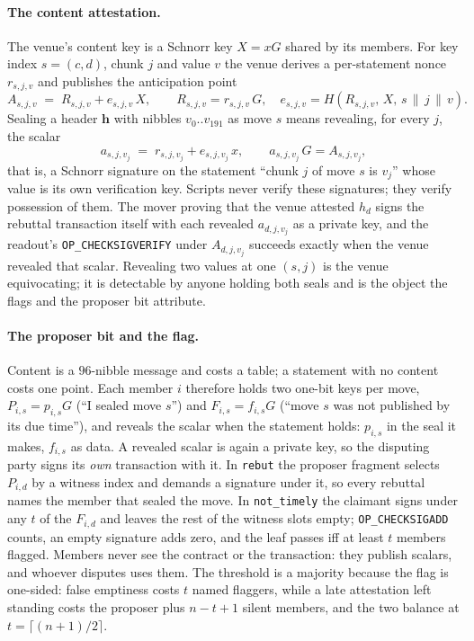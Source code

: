 \documentclass[11pt]{article}
\newcommand{\op}[1]{\texttt{OP\_#1}}
\begin{document}
\paragraph{The content attestation.}
The venue's content key is a Schnorr key $X = x G$ shared by its
members. For key index $s = (c, d)$, chunk $j$ and value $v$ the venue derives a
per-statement nonce $r_{s,j,v}$ and publishes the anticipation point
\[
  A_{s,j,v} \;=\; R_{s,j,v} + e_{s,j,v}\,X,
  \qquad R_{s,j,v} = r_{s,j,v}\,G,\quad
  e_{s,j,v} = H(R_{s,j,v},\,X,\,s\,\|\,j\,\|\,v).
\]
Sealing a header $\mathbf{h}$ with nibbles $v_0..v_{191}$ as move $s$
means revealing, for every $j$, the scalar
\[
  a_{s,j,v_j} \;=\; r_{s,j,v_j} + e_{s,j,v_j}\,x,
  \qquad a_{s,j,v_j}\,G = A_{s,j,v_j},
\]
that is, a Schnorr signature on the statement ``chunk $j$ of move $s$
is $v_j$'' whose value is its own verification key. Scripts never
verify these signatures; they verify possession of them. The mover
proving that the venue attested $h_d$ signs the rebuttal transaction
itself with each revealed $a_{d,j,v_j}$ as a private key, and the
readout's \op{CHECKSIGVERIFY} under $A_{d,j,v_j}$ succeeds exactly when
the venue revealed that scalar. Revealing two values at one $(s,j)$ is
the venue equivocating; it is detectable by anyone holding both seals
and is the object the flags and the proposer bit attribute.

\paragraph{The proposer bit and the flag.}
Content is a $96$-nibble message and costs a table; a statement with no
content costs one point. Each member $i$ therefore holds two one-bit
keys per move, $P_{i,s} = p_{i,s} G$ (``I sealed move $s$'') and
$F_{i,s} = f_{i,s} G$ (``move $s$ was not published by its due time''),
and reveals the scalar when the statement holds: $p_{i,s}$ in the seal
it makes, $f_{i,s}$ as data. A revealed scalar is again a private key,
so the disputing party signs its \emph{own} transaction with it. In
\texttt{rebut} the proposer fragment selects $P_{i,d}$ by a witness
index and demands a signature under it, so every rebuttal names the
member that sealed the move. In \texttt{not\_timely} the claimant
signs under any $t$ of the $F_{i,d}$ and leaves the rest of the
witness slots empty; \op{CHECKSIGADD} counts, an empty signature adds
zero, and the leaf passes iff at least $t$ members flagged. Members
never see the contract or the transaction: they publish scalars, and
whoever disputes uses them. The threshold is a majority because the
flag is one-sided: false emptiness costs $t$ named flaggers, while a
late attestation left standing costs the proposer plus $n-t+1$
silent members, and the two balance at $t = \lceil (n+1)/2 \rceil$.
\end{document}
